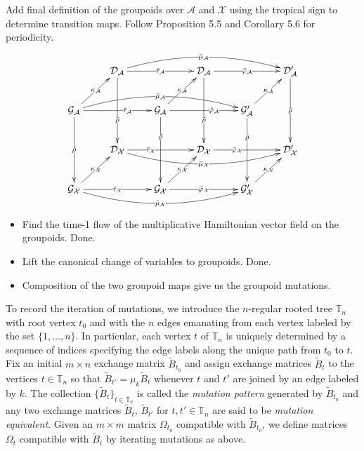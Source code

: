 \documentclass{amsart}
\numberwithin{equation}{section}
\newcommand{\cA}{\mathcal{A}}
\newcommand{\cG}{\mathcal{G}}
\renewcommand{\cD}{\mathcal{D}}
\newcommand{\cX}{\mathcal{X}}
\newcommand{\TT}{\mathbb{T}}
\begin{document}
Add final definition of the groupoids over $\cA$ and $\cX$ using the tropical sign to determine transition maps.
Follow \cite{gekhtman-nakanishi-rupel} Proposition 5.5 and Corollary 5.6 for periodicity.

\newpage

\begin{equation} \label{eq:GpdCD}
	\xymatrix{
		& \cD_\cA \ar[dd]|-(.65){\bar{\rho}} \ar[rr]|-{\bar{\tau}_\cA} \ar@/^1.2pc/[rrrr]|-{\bar{\mu}_\cA} && \cD_\cA \ar[dd]|-(.65){\bar{\rho}} \ar[rr]|-{\bar{\varphi}_\cA} && \cD'_\cA \ar[dd]|-{\bar{\rho}} \\
	\cG_\cA \ar[dd]|-{\tilde{\rho}} \ar[rr]|-(.65){\tilde{\tau}_\cA} \ar[ur]|-{\kappa_\cA} \ar@/^1.2pc/[rrrr]|-{\tilde{\mu}_\cA} && \cG_\cA \ar[dd]|-(.3){\tilde{\rho}} \ar[rr]|-(.65){\tilde{\varphi}_\cA} \ar[ur]|-{\kappa_\cA} && \cG'_\cA \ar[dd]|-(.3){\tilde{\rho}} \ar[ur]|-{\kappa_\cA} \\
		& \cD_\cX \ar[rr]|-(.35){\bar{\tau}_\cX} \ar@/_1.2pc/[rrrr]|-{\bar{\mu}_\cX} && \cD_\cX \ar[rr]|-(.35){\bar{\varphi}_\cX} && \cD'_\cX \\
	\cG_\cX \ar[rr]|-{\tilde{\tau}_\cX} \ar[ur]|-{\kappa_\cX} \ar@/_1.2pc/[rrrr]|-{\tilde{\mu}_\cX} && \cG_\cX \ar[rr]|-{\tilde{\varphi}_\cX} \ar[ur]|-{\kappa_\cX} && \cG'_\cX \ar[ur]|-{\kappa_\cX}
	}
\end{equation}

\begin{itemize}
\item Find the time-1 flow of the multiplicative Hamiltonian vector field on the groupoids.  Done.
\item Lift the canonical change of variables to groupoids.  Done.
\item Composition of the two groupoid maps give us the groupoid mutations.
\end{itemize}

\newpage 

To record the iteration of mutations, we introduce the $n$-regular rooted tree $\TT_n$ with root vertex $t_0$ and with the $n$ edges emanating from each vertex labeled by the set $\{1,\ldots,n\}$.
In particular, each vertex $t$ of $\TT_n$ is uniquely determined by a sequence of indices specifying the edge labels along the unique path from $t_0$ to $t$.
Fix an initial $m\times n$ exchange matrix $\tilde B_{t_0}$ and assign exchange matrices $\tilde B_t$ to the vertices $t\in\TT_n$ so that $\tilde B_{t'}=\mu_k\tilde B_t$ whenever $t$ and $t'$ are joined by an edge labeled by $k$.
The collection $\{\tilde B_t\}_{t\in\TT_n}$ is called the \emph{mutation pattern} generated by $\tilde B_{t_0}$ and any two exchange matrices $\tilde B_t$, $\tilde B_{t'}$ for $t,t'\in\TT_n$ are said to be \emph{mutation equivalent}.
Given an $m\times m$ matrix $\Omega_{t_0}$ compatible with $\tilde B_{t_0}$, we define matrices $\Omega_t$ compatible with $\tilde B_t$ by iterating mutations as above.
\end{document}
